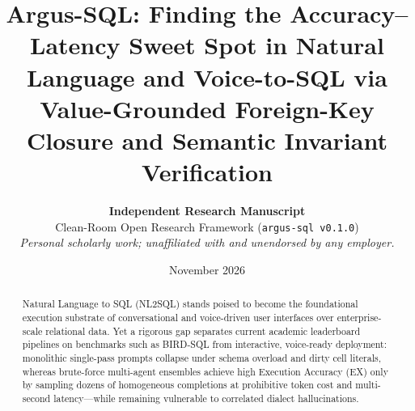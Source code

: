 \documentclass[10pt,twocolumn]{article}
\title{\textbf{Argus-SQL: Finding the Accuracy--Latency Sweet Spot in Natural Language and Voice-to-SQL via Value-Grounded Foreign-Key Closure and Semantic Invariant Verification}}
\author{
  \textbf{Independent Research Manuscript}\\
  \small Clean-Room Open Research Framework (\texttt{argus-sql v0.1.0})\\
  \small \textit{Personal scholarly work; unaffiliated with and unendorsed by any employer.}
}
\date{November 2026}
\begin{document}
\maketitle

\begin{abstract}
Natural Language to SQL (NL2SQL) stands poised to become the foundational execution substrate of conversational and voice-driven user interfaces over enterprise-scale relational data. Yet a rigorous gap separates current academic leaderboard pipelines on benchmarks such as BIRD-SQL from interactive, voice-ready deployment: monolithic single-pass prompts collapse under schema overload and dirty cell literals, whereas brute-force multi-agent ensembles achieve high Execution Accuracy (EX) only by sampling dozens of homogeneous completions at prohibitive token cost and multi-second latency—while remaining vulnerable to correlated dialect hallucinations.


\end{abstract}
\end{document}
